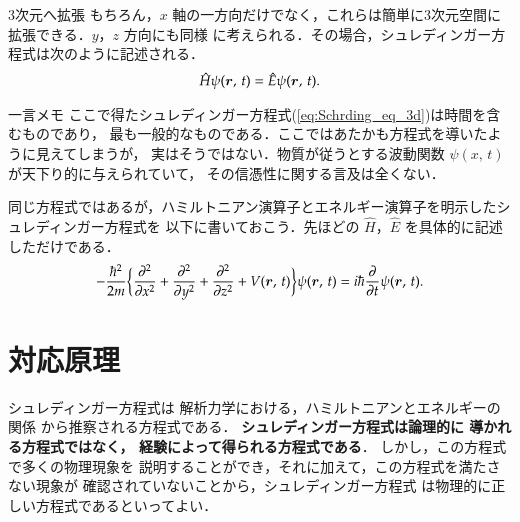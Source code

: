             \begin{mysmallsec}{3次元へ拡張}
            もちろん，$x$ 軸の一方向だけでなく，これらは簡単に3次元空間に拡張できる．$y$，$z$ 方向にも同様
            に考えられる．その場合，シュレディンガー方程式は次のように記述される．
                \begin{align}\label{eq:Schrding_eq_3d}
                    \hat{H} \psi(\br,\,t) = \hat{E} \psi(\br,\,t).
                \end{align}
            \end{mysmallsec}

            \begin{mysmallsec}{一言メモ}
            ここで得たシュレディンガー方程式(\ref{eq:Schrding_eq_3d})は時間を含むものであり，
            最も一般的なものである．ここではあたかも方程式を導いたように見えてしまうが，
            実はそうではない．物質が従うとする波動関数 $\psi(x,\,t)$ が天下り的に与えられていて，
            その信憑性に関する言及は全くない．

            同じ方程式ではあるが，ハミルトニアン演算子とエネルギー演算子を明示したシュレディンガー方程式を
            以下に書いておこう．先ほどの $\hat{H}$，$\hat{E}$ を具体的に記述しただけである．
                \begin{align}\label{eq:Schrding_eq2}
                    -\frac{\hbar^{2}}{2m}\biggl\{
                    \frac{\rd^{2}}{\rd x^{2}} + \frac{\rd^{2}}{\rd y^{2}} + \frac{\rd^{2}}{\rd z^{2}}
                    + V(\br,\,t) \biggr\} \psi(\br,\,t) = i\hbar\frac{\rd }{\rd t} \psi(\br,\,t).
                \end{align}
            \end{mysmallsec}

            \section{対応原理}
                シュレディンガー方程式は
                解析力学における，ハミルトニアンとエネルギーの関係
                から推察される方程式である．\textbf{
                シュレディンガー方程式は論理的に
                導かれる方程式ではなく，
                経験によって得られる方程式である}．
                しかし，この方程式で多くの物理現象を
                説明することができ，それに加えて，この方程式を満たさない現象が
                確認されていないことから，シュレディンガー方程式
                は物理的に正しい方程式であるといってよい．

